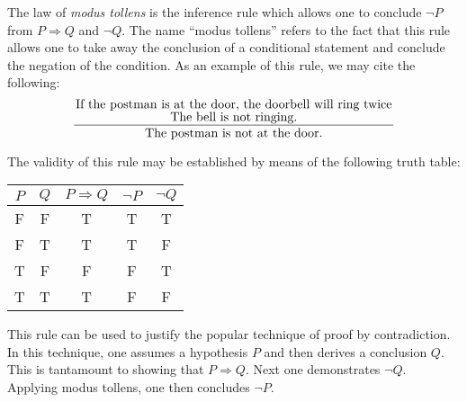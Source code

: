 \documentclass[12pt]{article}
\begin{document}
The law of \emph{modus tollens} is the inference rule which allows one to 
conclude $\neg P$ from $P \Rightarrow Q$ and $\neg Q$.  The name ``modus
tollens'' refers to the fact that this rule allows one to take away the 
conclusion of a conditional statement and conclude the negation of the 
condition.  As an example of this rule, we may cite the following:
\[
{{\hbox{If the postman is at the door, the doorbell will ring twice} \atop
\hbox{The bell is not ringing.}} \over
\hbox{The postman is not at the door.}}
\]

The validity of this rule may be established by means of the following
truth table:
\begin{center}
\begin{tabular}
{ccccc}
$P$ & $Q$ & $P \Rightarrow Q$ & $\neg P$ & $\neg Q$ \\
\hline
F & F & T & T & T \\
F & T & T & T & F \\
T & F & F & F & T \\
T & T & T & F & F
\end{tabular}
\end{center}

This rule can be used to justify the popular technique of proof by 
contradiction.  In this technique, one assumes a hypothesis $P$ and 
then derives a conclusion $Q$.  This is tantamount to showing that
$P \Rightarrow Q$.  Next one demonstrates $\neg Q$.  Applying modus
tollens, one then concludes $\neg P$.
\end{document}
